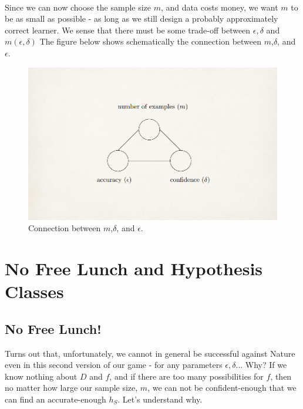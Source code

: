 ~\\
Since we can now choose the sample size $m$, and data costs money, we want $m$ to be as small as possible - as long as we still design a probably approximately correct learner. We sense that there must be some trade-off between $\epsilon,\delta$ and $m(\epsilon,\delta)$
The figure below shows schematically the connection between $m$,$\delta$, and $\epsilon$.

\begin{figure}[h!]
  \centering
    \includegraphics[scale=0.3]{m_eps_del.png}
    \caption{Connection between $m$,$\delta$, and $\epsilon$.}
\end{figure}


\section{No Free Lunch and Hypothesis Classes}




\subsection{No Free Lunch!}

Turns out that, unfortunately, we cannot in general be successful against Nature even in this second version of our game - for any parameters $\epsilon,\delta$...
Why? If we know nothing about $D$ and $f$, and if there are too many possibilities for $f$, then no matter how large our sample size, $m$, we can not be confident-enough that we can find an accurate-enough $h_S$. Let's understand why.
\vspace{5mm}

